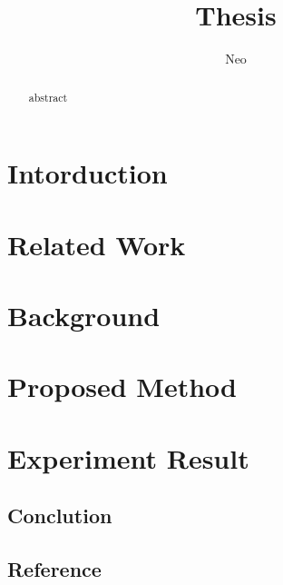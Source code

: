 \documentclass{article}
\title{Thesis}
\author{Neo}
\date{}
\begin{document}
\maketitle
\begin{abstract}
    abstract
\end{abstract}

\section{Intorduction}


\section{Related Work}


\section{Background}


\section{Proposed Method}


\section{Experiment Result}


\subsection{Conclution}


\subsection{Reference}

% 
% 
\end{document}
